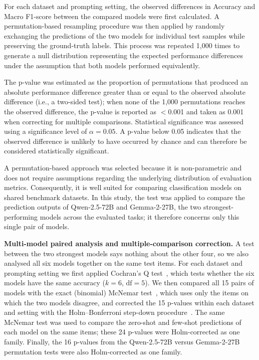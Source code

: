 \documentclass[10pt,letterpaper]{article}
\begin{document}
For each dataset and prompting setting, the observed differences in Accuracy and Macro F1-score between the compared models were first calculated. A permutation-based resampling procedure was then applied by randomly exchanging the predictions of the two models for individual test samples while preserving the ground-truth labels. This process was repeated 1,000 times to generate a null distribution representing the expected performance differences under the assumption that both models performed equivalently.

The p-value was estimated as the proportion of permutations that produced an absolute performance difference greater than or equal to the observed absolute difference (i.e., a two-sided test); when none of the 1,000 permutations reaches the observed difference, the p-value is reported as $<$0.001 and taken as 0.001 when correcting for multiple comparisons. Statistical significance was assessed using a significance level of $\alpha = 0.05$. A p-value below 0.05 indicates that the observed difference is unlikely to have occurred by chance and can therefore be considered statistically significant.

A permutation-based approach was selected because it is non-parametric and does not require assumptions regarding the underlying distribution of evaluation metrics. Consequently, it is well suited for comparing classification models on shared benchmark datasets. In this study, the test was applied to compare the prediction outputs of Qwen-2.5-72B and Gemma-2-27B, the two strongest-performing models across the evaluated tasks; it therefore concerns only this single pair of models.

\textbf{Multi-model paired analysis and multiple-comparison correction.} A test between the two strongest models says nothing about the other four, so we also analysed all six models together on the same test items. For each dataset and prompting setting we first applied Cochran's Q test~\cite{b57}, which tests whether the six models have the same accuracy ($k = 6$, $\mathrm{df} = 5$). We then compared all 15 pairs of models with the exact (binomial) McNemar test~\cite{b58,b59}, which uses only the items on which the two models disagree, and corrected the 15 p-values within each dataset and setting with the Holm--Bonferroni step-down procedure~\cite{b56,b60}. The same McNemar test was used to compare the zero-shot and few-shot predictions of each model on the same items; these 24 p-values were Holm-corrected as one family. Finally, the 16 p-values from the Qwen-2.5-72B versus Gemma-2-27B permutation tests were also Holm-corrected as one family.
\end{document}
